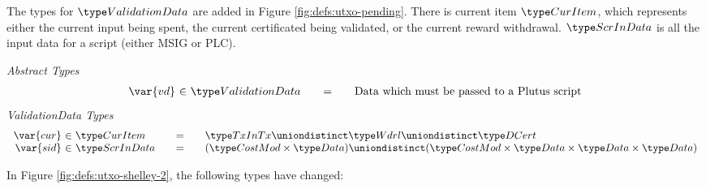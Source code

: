The types for $\ValidationData$ are added in Figure \ref{fig:defs:utxo-pending}.
There is current item $\CurItem$, which represents either the current input being
spent, the current certificated being validated, or the current reward
withdrawal. $\ScrInData$ is all the input data for a script (either MSIG or PLC).

\begin{figure*}[htb]
  \emph{Abstract Types}
  \begin{equation*}
    \begin{array}{r@{~\in~}l@{\qquad=\qquad}l}
      \var{vd}
      & \ValidationData
      & \text{Data which must be passed to a Plutus script}
    \end{array}
  \end{equation*}
  \emph{ValidationData Types}
  \begin{equation*}
    \begin{array}{r@{~\in~}l@{\qquad=\qquad}l}
      \var{cur}
      & \CurItem
      & \TxInTx \uniondistinct \Wdrl \uniondistinct \DCert
      \\
      \var{sid}
      & \ScrInData
      & (\CostMod \times \Data) \uniondistinct (\CostMod \times \Data \times \Data \times \Data)
    \end{array}
  \end{equation*}
  \caption{Definitions used to make ValidationData}
  \label{fig:defs:utxo-pending}
\end{figure*}


In Figure \ref{fig:defs:utxo-shelley-2}, the following types have changed:

